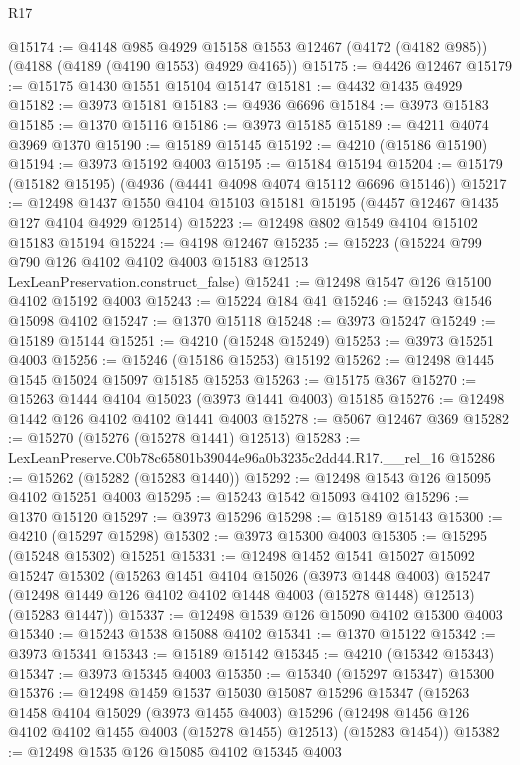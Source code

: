 \begin{lexlean}{R17}
\begin{coremodule}
@15174 := @4148
    @985
    @4929
    @15158
    @1553
    @12467
    (@4172 (@4182 @985))
    (@4188 (@4189 (@4190 @1553) @4929 @4165))
@15175 := @4426 @12467
@15179 := @15175 @1430 @1551 @15104 @15147
@15181 := @4432 @1435 @4929
@15182 := @3973 @15181
@15183 := @4936 @6696
@15184 := @3973 @15183
@15185 := @1370 @15116
@15186 := @3973 @15185
@15189 := @4211 @4074 @3969 @1370
@15190 := @15189 @15145
@15192 := @4210 (@15186 @15190)
@15194 := @3973 @15192 @4003
@15195 := @15184 @15194
@15204 := @15179 (@15182 @15195) (@4936 (@4441 @4098 @4074 @15112 @6696 @15146))
@15217 := @12498 @1437 @1550 @4104 @15103 @15181 @15195 (@4457 @12467 @1435 @127 @4104 @4929 @12514)
@15223 := @12498 @802 @1549 @4104 @15102 @15183 @15194
@15224 := @4198 @12467
@15235 := @15223
    (@15224 @799 @790 @126 @4102 @4102 @4003 @15183 @12513 LexLeanPreservation.construct_false)
@15241 := @12498 @1547 @126 @15100 @4102 @15192 @4003
@15243 := @15224 @184 @41
@15246 := @15243 @1546 @15098 @4102
@15247 := @1370 @15118
@15248 := @3973 @15247
@15249 := @15189 @15144
@15251 := @4210 (@15248 @15249)
@15253 := @3973 @15251 @4003
@15256 := @15246 (@15186 @15253) @15192
@15262 := @12498 @1445 @1545 @15024 @15097 @15185 @15253
@15263 := @15175 @367
@15270 := @15263 @1444 @4104 @15023 (@3973 @1441 @4003) @15185
@15276 := @12498 @1442 @126 @4102 @4102 @1441 @4003
@15278 := @5067 @12467 @369
@15282 := @15270 (@15276 (@15278 @1441) @12513)
@15283 := LexLeanPreserve.C0b78c65801b39044e96a0b3235c2dd44.R17.__rel_16
@15286 := @15262 (@15282 (@15283 @1440))
@15292 := @12498 @1543 @126 @15095 @4102 @15251 @4003
@15295 := @15243 @1542 @15093 @4102
@15296 := @1370 @15120
@15297 := @3973 @15296
@15298 := @15189 @15143
@15300 := @4210 (@15297 @15298)
@15302 := @3973 @15300 @4003
@15305 := @15295 (@15248 @15302) @15251
@15331 := @12498
    @1452
    @1541
    @15027
    @15092
    @15247
    @15302
    (@15263
      @1451
      @4104
      @15026
      (@3973 @1448 @4003)
      @15247
      (@12498 @1449 @126 @4102 @4102 @1448 @4003 (@15278 @1448) @12513)
      (@15283 @1447))
@15337 := @12498 @1539 @126 @15090 @4102 @15300 @4003
@15340 := @15243 @1538 @15088 @4102
@15341 := @1370 @15122
@15342 := @3973 @15341
@15343 := @15189 @15142
@15345 := @4210 (@15342 @15343)
@15347 := @3973 @15345 @4003
@15350 := @15340 (@15297 @15347) @15300
@15376 := @12498
    @1459
    @1537
    @15030
    @15087
    @15296
    @15347
    (@15263
      @1458
      @4104
      @15029
      (@3973 @1455 @4003)
      @15296
      (@12498 @1456 @126 @4102 @4102 @1455 @4003 (@15278 @1455) @12513)
      (@15283 @1454))
@15382 := @12498 @1535 @126 @15085 @4102 @15345 @4003

\end{coremodule}
\end{lexlean}
